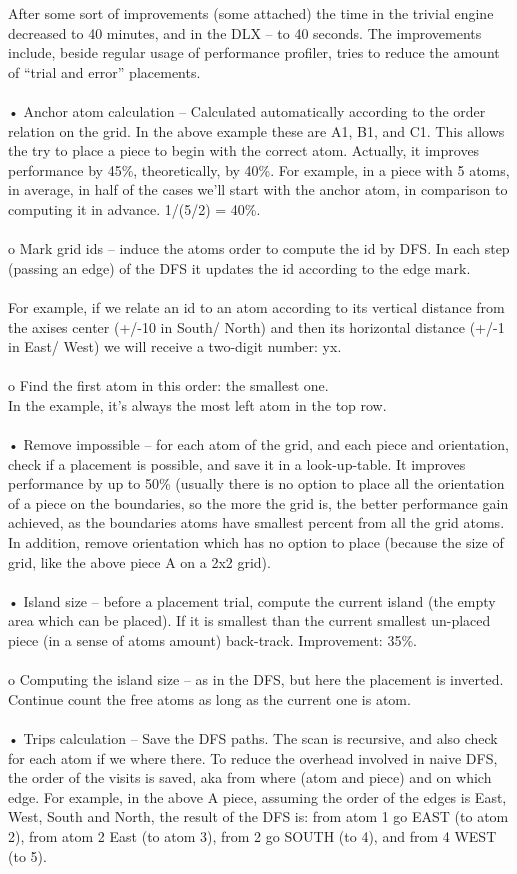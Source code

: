 \documentclass[a4paper,twoside,10pt]{report}
\begin{document}
After some sort of improvements (some attached) the time in the trivial engine decreased to 40 minutes, and in the DLX – to 40 seconds. The improvements include, beside regular usage of performance profiler, tries to reduce the amount of “trial and error” placements.
\\\\
•	Anchor atom calculation – Calculated automatically according to the order relation on the grid. In the above example these are A1, B1, and C1. This allows the try to place a piece to begin with the correct atom. Actually, it improves performance by 45\%, theoretically, by 40\%. For example, in a piece with 5 atoms, in average, in half of the cases we’ll start with the anchor atom, in comparison to computing it in advance. 1/(5/2) = 40\%.
\\\\o	Mark grid ids – induce the atoms order to compute the id by DFS. In each step (passing an edge) of the DFS it updates the id according to the edge mark.
\\\\For example, if we relate an id to an atom according to its vertical distance from the axises center (+/-10 in South/ North) and then its horizontal distance (+/-1 in East/ West) we will receive a two-digit number: yx.
\\\\o	Find the first atom in this order: the smallest one.
\\In the example, it’s always the most left atom in the top row.
\\\\•	Remove impossible – for each atom of the grid, and each piece and orientation, check if a placement is possible, and save it in a look-up-table. It improves performance by up to 50\% (usually there is no option to place all the orientation of a piece on the boundaries, so the more the grid is, the better performance gain achieved, as the boundaries atoms have smallest percent from all the grid atoms. In addition, remove orientation which has no option to place (because the size of grid, like the above piece A on a 2x2 grid).
\\\\•	Island size – before a placement trial, compute the current island (the empty area which can be placed). If it is smallest than the current smallest un-placed piece (in a sense of atoms amount) back-track. Improvement: 35\%.
\\\\o	Computing the island size – as in the DFS, but here the placement is inverted. Continue count the free atoms as long as the current one is atom.\\
\\•	Trips calculation – Save the DFS paths. The scan is recursive, and also check for each atom if we where there. To reduce the overhead involved in naive DFS, the order of the visits is saved, aka from where (atom and piece) and on which edge.
For example, in the above A piece, assuming the order of the edges is East, West, South and North, the result of the DFS  is: from atom 1 go EAST (to atom 2), from atom 2 East (to atom 3), from 2 go SOUTH (to 4), and from 4 WEST (to 5).
\\
\end{document}
